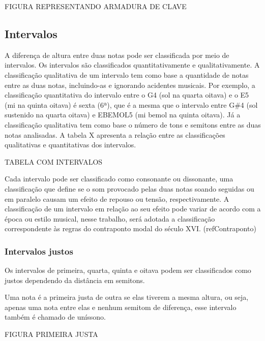       FIGURA REPRESENTANDO ARMADURA DE CLAVE

    \subsection[Intervalos]{Intervalos}

      A diferença de altura entre duas notas pode ser classificada por meio de intervalos. Os intervalos são classificados quantitativamente e qualitativamente. A classificação qualitativa de um intervalo tem como base a quantidade de notas entre as duas notas, incluindo-as e ignorando acidentes musicais. Por exemplo, a classificação quantitativa do intervalo entre o G4 (sol na quarta oitava) e o E5 (mi na quinta oitava) é sexta (6ª), que é a mesma que o intervalo entre G\#4 (sol sustenido na quarta oitava) e EBEMOL5 (mi bemol na quinta oitava). Já a classificação qualitativa tem como base o número de tons e semitons entre as duas notas analisadas. A tabela X apresenta a relação entre as classificações qualitativas e quantitativas dos intervalos.

      TABELA COM INTERVALOS

      Cada intervalo pode ser classificado como consonante ou dissonante, uma classificação que define se o som provocado pelas duas notas soando seguidas ou em paralelo causam um efeito de repouso ou tensão, respectivamente. A classificação de um intervalo em relação ao seu efeito pode variar de acordo com a época ou estilo musical, nesse trabalho, será adotada a classificação correspondente às regras do contraponto modal do século XVI. (refContraponto)

      \subsubsection[Intervalos Justos]{Intervalos justos}

        Os intervalos de primeira, quarta, quinta e oitava podem ser classificados como justos dependendo da distância em semitons.

        Uma nota é a primeira justa de outra se elas tiverem a mesma altura, ou seja, apenas uma nota entre elas e nenhum semitom de diferença, esse intervalo também é chamado de uníssono.

        FIGURA PRIMEIRA JUSTA

